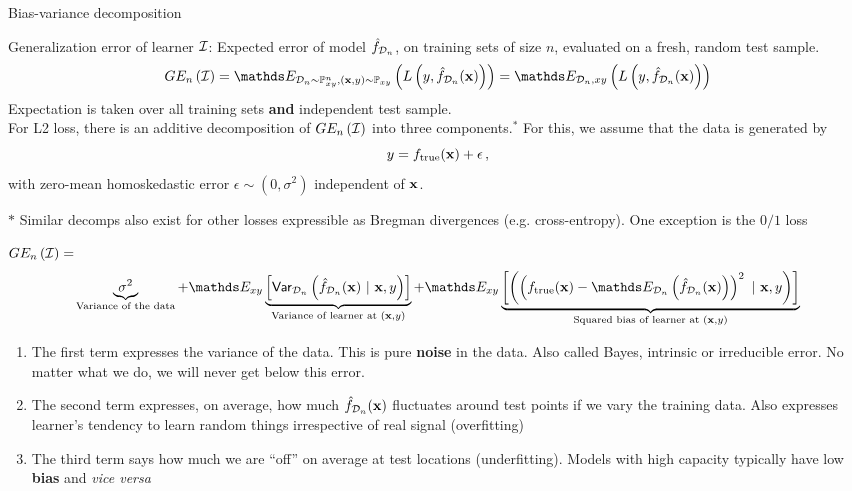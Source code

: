 \documentclass[11pt,compress,t,notes=noshow, xcolor=table]{beamer}
\begin{document}
\begin{vbframe} {Bias-variance decomposition}

Generalization error of learner  $\mathcal{I}$: 
Expected error of model $\hat{f}_{\mathcal{D}_n}$, on training sets of size $n$, evaluated on a fresh, random test sample.
  $$GE_n\left(\ind\right) = \E_{\D_n \sim \Pxy^n, (\xv, y) \sim \Pxy}\left( L\left(y, \fh_{\D_n}(\xv)\right) \right) = \E_{\D_n, xy}\left( L\left(y, \fh_{\D_n}(\xv)\right) \right)  $$
Expectation is taken over all training sets \textbf{and} independent test sample.\\
\lz
For L2 loss, there is an additive decomposition of $GE_n\left(\mathcal{I}\right)$ into three components.$^{\ast}$ For this, we assume that the data is generated by 
$$
y = f_{\text{true}}(\mathbf{x}) + \epsilon\,,
$$
with zero-mean homoskedastic error $\epsilon \sim (0, \sigma^2)$ independent of $\mathbf{x}$.
\vspace{0.1cm}

{\scriptsize ${\ast}$ Similar decomps also exist for other losses expressible as Bregman divergences (e.g. cross-entropy). One exception is the $0/1$ loss }

\framebreak 


\begin{footnotesize}
$GE_n\left(\mathcal{I}\right) =$  
$$
 \underbrace{\sigma^2}_{\text{Variance of the data}} + \E_{xy}\underbrace{\left[\var_{\D_n}\left(\fh_{\D_n}(\xv) ~|~\xv, y\right)\right]}_{\text{Variance of learner at } (\xv, y)} + \E_{xy}\underbrace{\left[\left(\left(\ftrue(\xv)-\E_{\D_n}\left(\fh_{\D_n}(\xv)\right)\right)^2~|~\xv, y\right)\right]}_{\text{Squared bias of learner at } (\xv, y)}  
$$
\end{footnotesize}
\begin{enumerate}
  \item The first term expresses the variance of the data. 
    This is pure \textbf{noise} in the data.
    Also called Bayes, intrinsic or irreducible error.
    No matter what we do, we will never get below this error.
  \item The second term expresses, on average, how much $\hat{f}_{\mathcal{D}_n}(\mathbf{x})$ fluctuates around test points if we vary the training data. Also expresses learner's tendency to learn random things irrespective of real signal (overfitting)
  \item The third term says how much we are ``off'' on average at test locations (underfitting).
    Models with high capacity typically have low \textbf{bias} and \textit{vice versa}
\end{enumerate}





\end{vbframe}
\end{document}
